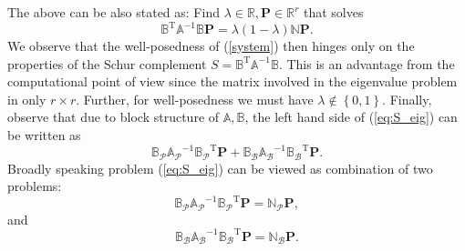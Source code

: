 \documentclass[a4paper,10pt]{article}
\newcommand{\R}{\ensuremath{\mathbb{R}}}
\newcommand{\Ap}{\ensuremath{\mathbb{A}_{\mathcal{P}}}}
\newcommand{\Ab}{\ensuremath{\mathbb{A}_{\mathcal{B}}}}
\newcommand{\Bp}{\ensuremath{\mathbb{B}_{\mathcal{P}}}}
\newcommand{\Bb}{\ensuremath{\mathbb{B}_{\mathcal{B}}}}
\newcommand{\Amat}{\ensuremath{\mathbb{A}}}
\newcommand{\Bmat}{\ensuremath{\mathbb{B}}}
\newcommand{\Bmatt}{\ensuremath{\mathbb{B}^{\text{T}}}}
\newcommand{\Nmat}{\ensuremath{\mathbb{N}}}
\newcommand{\Pvec}{\ensuremath{\mathbf{P}}}
\begin{document}
  The above can be also stated as: Find $\lambda\in\R, \Pvec\in\R^r$ that solves
  \begin{equation}
    \label{eq:S_eig}
    \Bmatt\Amat^{-1}\Bmat\Pvec=\lambda\left(1-\lambda\right)\Nmat\Pvec.
  \end{equation}
  We observe that the well-posedness of (\ref{system}) then hinges only on the
  properties of the Schur complement $S=\Bmatt\Amat^{-1}\Bmat$. This is an
  advantage from the computational point of view since the matrix involved in 
  the eigenvalue problem in only $r\times r$. Further, for well-posedness we
  must have $\lambda\notin\left\{0, 1\right\}$. Finally, observe that due to
  block structure of $\Amat, \Bmat$, the left hand side of (\ref{eq:S_eig})
  can be written as
  \[
    \Bp\Ap^{-1}\Bp^{\text{T}}\Pvec + \Bb\Ab^{-1}\Bb^{\text{T}}\Pvec.
  \]
  Broadly speaking problem (\ref{eq:S_eig}) can be viewed as combination
  of two problems:
  \begin{equation}
    \label{eq:Sp_eig}
    \Bp\Ap^{-1}\Bp^{\text{T}}\Pvec = \Nmat_\mathcal{P}\Pvec,
  \end{equation}
  and
  \begin{equation}
    \label{eq:Sb_eig}
    \Bb\Ab^{-1}\Bb^{\text{T}}\Pvec = \Nmat_\mathcal{B}\Pvec.
  \end{equation}
\end{document}
